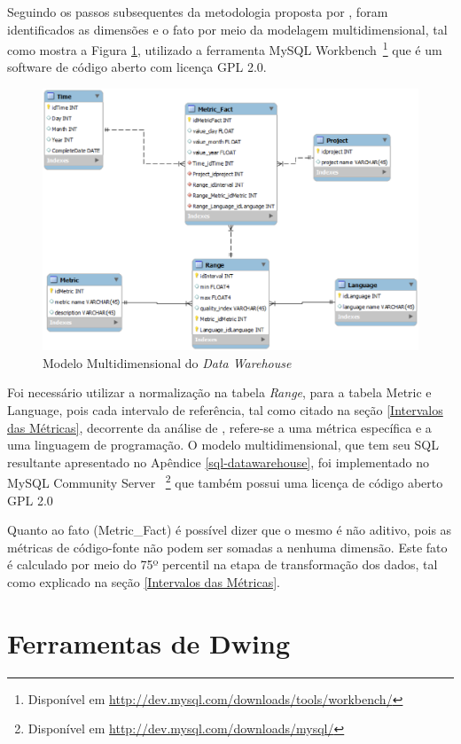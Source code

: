 Seguindo os passos subsequentes da metodologia proposta por , foram identificados as dimensões e o fato por meio da modelagem multidimensional, tal como mostra a Figura \ref{esquema}, utilizado a ferramenta MySQL Workbench~\footnote{Disponível em \url{http://dev.mysql.com/downloads/tools/workbench/}} que é um software de código aberto com licença GPL 2.0.


\begin{figure}[ht!]
\centering
\includegraphics[keepaspectratio=false,scale=0.60]{apendices/esquema.eps}
\caption{Modelo Multidimensional do \textit{Data Warehouse}}
\label{esquema}
\end{figure}
\FloatBarrier

Foi necessário utilizar a normalização na tabela \textit{Range}, para a tabela Metric e Language, pois cada intervalo de referência, tal como citado na seção \ref{Intervalos das Métricas}, decorrente da análise de , refere-se a uma métrica específica e a uma linguagem de programação. O modelo multidimensional, que tem seu SQL resultante apresentado no Apêndice \ref{sql-datawarehouse}, foi implementado no MySQL Community Server ~\footnote{Disponível em \url{http://dev.mysql.com/downloads/mysql/}} que também possui uma licença de código aberto GPL 2.0

Quanto ao fato (Metric\_Fact) é possível dizer que o mesmo é não aditivo, pois as métricas de código-fonte não podem ser somadas a nenhuma dimensão. Este fato é calculado por meio do 75º percentil na etapa de transformação dos dados, tal como explicado na seção \ref{Intervalos das Métricas}.


\section{Ferramentas de Dwing}

